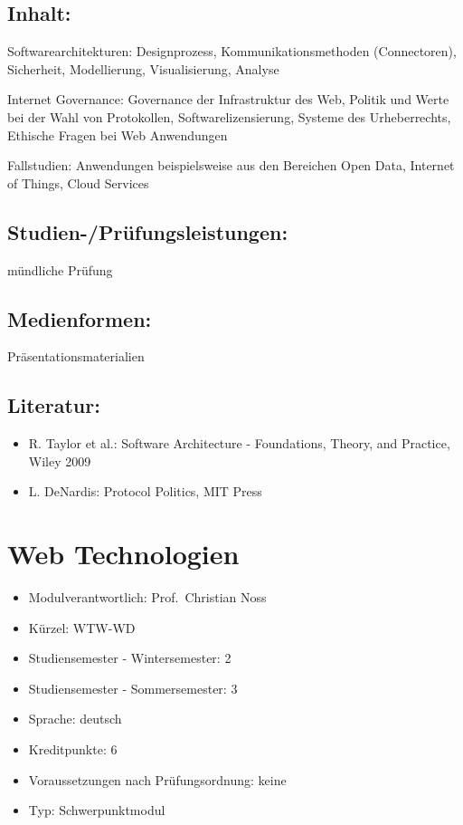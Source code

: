 \section*{Inhalt:}\label{inhalt-22}

Softwarearchitekturen: Designprozess, Kommunikationsmethoden
(Connectoren), Sicherheit, Modellierung, Visualisierung, Analyse

Internet Governance: Governance der Infrastruktur des Web, Politik und
Werte bei der Wahl von Protokollen, Softwarelizensierung, Systeme des
Urheberrechts, Ethische Fragen bei Web Anwendungen

Fallstudien: Anwendungen beispielsweise aus den Bereichen Open Data,
Internet of Things, Cloud Services

\section*{Studien-/Prüfungsleistungen:}\label{studien-pruxfcfungsleistungen-22}

mündliche Prüfung

\section*{Medienformen:}\label{medienformen-22}

Präsentationsmaterialien

\section*{Literatur:}\label{literatur-19}

\begin{itemize}
\tightlist
\item
  R. Taylor et al.: Software Architecture - Foundations, Theory, and
  Practice, Wiley 2009
\item
  L. DeNardis: Protocol Politics, MIT Press
\end{itemize}

\chapter{Web Technologien}\label{web-technologien}

\begin{itemize}
\tightlist
\item
  Modulverantwortlich: Prof.~Christian Noss
\item
  Kürzel: WTW-WD
\item
  Studiensemester - Wintersemester: 2
\item
  Studiensemester - Sommersemester: 3
\item
  Sprache: deutsch
\item
  Kreditpunkte: 6
\item
  Voraussetzungen nach Prüfungsordnung: keine
\item
  Typ: Schwerpunktmodul
\end{itemize}

